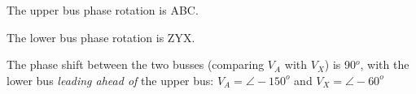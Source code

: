 The upper bus phase rotation is ABC.

\vskip 10pt

The lower bus phase rotation is ZYX.

\vskip 10pt

The phase shift between the two busses (comparing $V_A$ with $V_X$) is 90$^{o}$, with the lower bus {\it leading ahead of} the upper bus: $V_A = \angle -150^o$ and $V_X = \angle -60^o$










